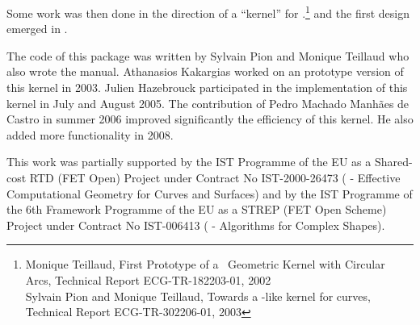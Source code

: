 Some work was then done in the direction of a ``kernel'' for
\cgal.\footnote{Monique Teillaud, First Prototype of a
\cgal\ Geometric Kernel with Circular Arcs, Technical Report
ECG-TR-182203-01, 2002\\Sylvain Pion and Monique Teillaud,
Towards a \cgal-like kernel for curves, Technical Report
ECG-TR-302206-01, 2003} and the first design emerged in
\cite{cgal:ekptt-tock-04}.

The code of this package was written by Sylvain Pion and Monique
Teillaud who also wrote the manual. Athanasios Kakargias worked on an
prototype version of this kernel in 2003. Julien Hazebrouck
participated in the implementation of this kernel in July and August
2005. The contribution of Pedro Machado Manh\~{a}es de Castro in
summer 2006 improved significantly the efficiency of this kernel. 
He also added more functionality in 2008. 

This work was partially supported by the IST Programme of the EU as a
Shared-cost RTD (FET Open) Project under Contract No IST-2000-26473
( - Effective
Computational Geometry for Curves and Surfaces) and by the IST
Programme of the 6th Framework Programme of the EU as a STREP (FET
Open Scheme) Project under Contract No IST-006413
( - Algorithms for Complex
Shapes).
